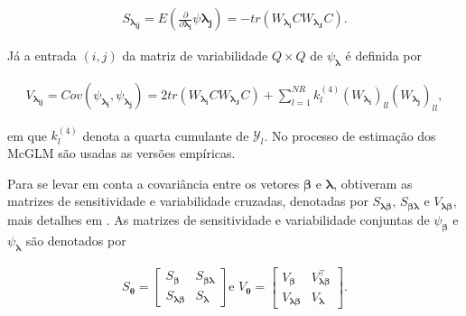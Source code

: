 \documentclass[AMA,STIX1COL]{WileyNJD-v2}
\begin{document}
\begin{equation}
  \begin{aligned}
    S_{\boldsymbol{\lambda_{ij}}} = E \left (\frac{\partial }{\partial \boldsymbol{\lambda_{i}}} \psi \boldsymbol{\lambda_{j}}\right) = -tr(W_{\boldsymbol{\lambda_{i}}} CW_{\boldsymbol{\lambda_{J}}} C).
  \end{aligned}
\end{equation}

\noindent Já a entrada $(i,j)$ da matriz de variabilidade $Q \times Q$ de $\psi_{\boldsymbol{\lambda}}$ é definida por

\begin{equation}
  \begin{aligned}
V_{\boldsymbol{\lambda_{ij}}} = Cov\left ( \psi_{\boldsymbol{\lambda_{i}}}, \psi_{\boldsymbol{\lambda_{j}}} \right) = 2tr(W_{\boldsymbol{\lambda_{i}}} CW_{\boldsymbol{\lambda_{J}}} C) + \sum_{l=1}^{NR} k_{l}^{(4)} (W_{\boldsymbol{\lambda_{i}}})_{ll} (W_{\boldsymbol{\lambda_{j}}})_{ll},
  \end{aligned}
\end{equation}

\noindent em que $k_{l}^{(4)}$ denota a quarta cumulante de $\mathcal{Y}_{l}$. No processo de estimação dos McGLM são usadas as versões empíricas.

Para se levar em conta a covariância entre os vetores $\boldsymbol{\beta}$ e $\boldsymbol{\lambda}$, \citet{Bonat16} obtiveram as matrizes de  sensitividade e variabilidade cruzadas, denotadas por $S_{\boldsymbol{\lambda \beta}}$, $S_{\boldsymbol{\beta \lambda}}$ e $V_{\boldsymbol{\lambda \beta}}$, mais detalhes em \citep{Bonat16}. As matrizes de sensitividade e variabilidade conjuntas de $\psi_{\boldsymbol{\beta}}$ e $\psi_{\boldsymbol{\lambda}}$ são denotados por

\begin{equation}
  \begin{aligned}
    S_{\boldsymbol{\theta}} = \begin{bmatrix}
      S_{\boldsymbol{\beta}} & S_{\boldsymbol{\beta\lambda}} \\ 
      S_{\boldsymbol{\lambda\beta}} & S_{\boldsymbol{\lambda}} 
      \end{bmatrix} \text{e } V_{\boldsymbol{\theta}} = \begin{bmatrix}
      V_{\boldsymbol{\beta}} & V^{\top}_{\boldsymbol{\lambda\beta}} \\ 
      V_{\boldsymbol{\lambda\beta}} & V_{\boldsymbol{\lambda}} 
    \end{bmatrix}.
  \end{aligned}
\end{equation}
\end{document}
